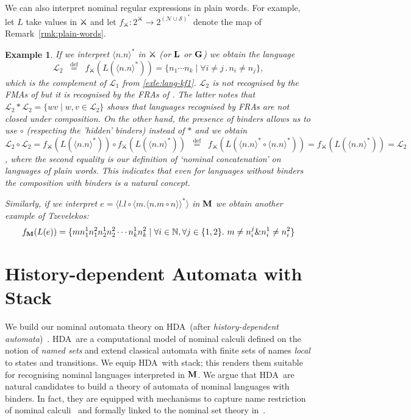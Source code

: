 \documentclass[runningheads,a4paper]{llncs}
\newcommand{\mmdef}{\mbox{$\;\;\stackrel{\mathrm{def}}{=}\;\;$}}
\newcommand{\hda}{HDA}
\newtheorem{example}{Theorem}[section]
\newtheorem{example}{Example}[section]
\begin{document}
We can also interpret nominal regular expressions in plain words. For
example, let $L$ take values in $\swords$ and let
$f_{\swords}:2^{\swords}\to 2^{(\mathcal{N}{\cup}\mathcal{S})^\ast}$
denote the map of Remark~\ref{rmk:plain-words}.

\begin{example}\label{exle:tzev-lang}
  If we interpret $\langle n. n \rangle^\ast$ in $\swords$ 
  (or $\mathbf{L}$ or $\mathbf{G}$) 
  we obtain the language
\begin{equation*}\label{eqn:lang2} 
\mathcal{L}_2
\mmdef f_{\swords}(L(\langle n. n  \rangle^\ast)) 
= \{n_1 \cdots
  n_k \mid \forall i\not=j \,.\,n_i \not=
  n_j\},
\end{equation*} 
which is the complement of $\mathcal{L}_1$ from
\eqref{exle:lang-kf1}. $\mathcal{L}_2$ is not recognised by the FMAs
of \cite{kaminskifrancez94} but it is recognised by the FRAs of
\cite{tze11}. The latter notes that $\mathcal{L}_2 \ast \mathcal{L}_2
=\{wv\mid w,v\in\mathcal{L}_2\}$ shows that languages recognised by
FRAs are not closed under composition. On the other hand, the presence
of binders allows us to use $\circ$ (respecting the 'hidden' binders)
instead of $\ast$ and we obtain $\mathcal{L}_2 \circ \mathcal{L}_2 =
f_{\swords}(L(\langle n. n \rangle^\ast)) \circ f_{\swords}(L(\langle
n. n \rangle^\ast)) \mmdef f_{\swords}(L(\langle n. n
\rangle^\ast\circ\langle n. n \rangle^\ast)) =f_{\swords}(L(\langle
n. n \rangle^\ast))=\mathcal{L}_2$, where the second equality is our
definition of `nominal concatenation' on languages of
plain words. This indicates that even for languages without binders
the composition with binders is a natural concept.

Similarly, if we interpret $e=\langle l. l{\circ}\langle m. \langle
n. m{\circ}n \rangle \rangle^\ast \rangle$ in $\mathbf{M}$
we obtain another example of Tzevelekos:
\begin{equation*}\label{eqn:lang1}
f_{\mathbf{M}}(L(e))
=
\{m n^1_1n^2_1n^1_2n^2_2\cdots n^1_kn^2_k \mid \forall i \in \mathbb{N}, \forall j \in \{1,2\}.\ m\not=n^j_i \& n^1_i \not= n^2_i\}
\end{equation*}
\end{example}

\section{History-dependent Automata with Stack}\label{sec:hdns}
We build our nominal automata theory on \hda\ (after
\emph{history-dependent automata})~\cite{pis99}.
\hda\ are a computational model of nominal calculi defined on the
notion of \emph{named sets} and extend classical automata with finite
sets of names \emph{local} to states and transitions.
We equip \hda\ with stack; this renders them suitable for recognising
nominal languages interpreted in $\mathbf{M}$.
We argue that \hda\ are natural candidates to build a theory of
automata of nominal languages with binders.
In fact, they are equipped with mechanisms to capture name restriction
of nominal calculi~\cite{fmt05,fmtkv04,fmt03-b} and formally linked to
the nominal set theory in~\cite{gmm06,fs:cmcs04}.
\end{document}
